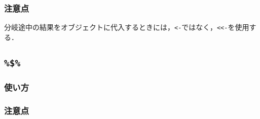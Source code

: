 \documentclass[
]{article}
\begin{document}
\hypertarget{ux6ce8ux610fux70b9-1}{%
\subsubsection{注意点}\label{ux6ce8ux610fux70b9-1}}

分岐途中の結果をオブジェクトに代入するときには，\texttt{\textless{}-}ではなく，\texttt{\textless{}\textless{}-}を使用する．

\hypertarget{section-1}{%
\subsection{\texorpdfstring{\texttt{\%\$\%}}{\%\$\%}}\label{section-1}}

\hypertarget{ux4f7fux3044ux65b9-2}{%
\subsubsection{使い方}\label{ux4f7fux3044ux65b9-2}}

\hypertarget{ux6ce8ux610fux70b9-2}{%
\subsubsection{注意点}\label{ux6ce8ux610fux70b9-2}}
\end{document}
